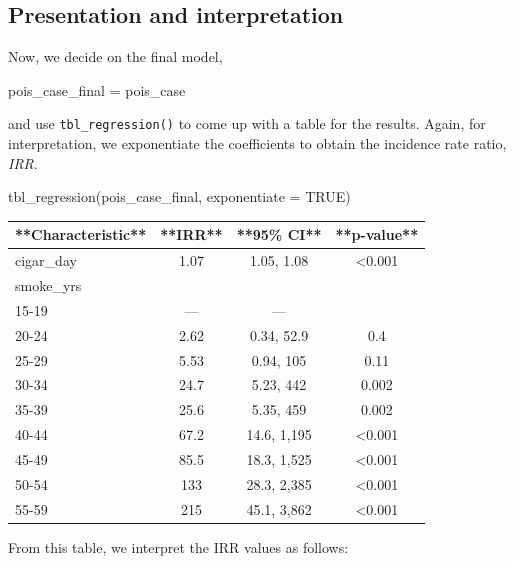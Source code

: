 \documentclass[
  10pt,
]{krantz}
\newenvironment{Shaded}{\begin{snugshade}}{\end{snugshade}}
\newcommand{\AttributeTok}[1]{\textcolor[rgb]{0.77,0.63,0.00}{#1}}
\newcommand{\ConstantTok}[1]{\textcolor[rgb]{0.00,0.00,0.00}{#1}}
\newcommand{\FunctionTok}[1]{\textcolor[rgb]{0.00,0.00,0.00}{#1}}
\newcommand{\NormalTok}[1]{#1}
\newcommand{\OtherTok}[1]{\textcolor[rgb]{0.56,0.35,0.01}{#1}}
\begin{document}
\hypertarget{presentation-and-interpretation-3}{%
\subsection{Presentation and interpretation}\label{presentation-and-interpretation-3}}

Now, we decide on the final model,

\begin{Shaded}
\begin{Highlighting}[]
\NormalTok{pois\_case\_final }\OtherTok{=}\NormalTok{ pois\_case}
\end{Highlighting}
\end{Shaded}

and use \texttt{tbl\_regression()} to come up with a table for the results. Again, for interpretation, we exponentiate the coefficients to obtain the incidence rate ratio, \emph{IRR}.

\begin{Shaded}
\begin{Highlighting}[]
\FunctionTok{tbl\_regression}\NormalTok{(pois\_case\_final, }\AttributeTok{exponentiate =} \ConstantTok{TRUE}\NormalTok{)}
\end{Highlighting}
\end{Shaded}

\begin{tabular}{l|c|c|c}
\hline
**Characteristic** & **IRR** & **95\% CI** & **p-value**\\
\hline
cigar\_day & 1.07 & 1.05, 1.08 & <0.001\\
\hline
smoke\_yrs &  &  & \\
\hline
15-19 & — & — & \\
\hline
20-24 & 2.62 & 0.34, 52.9 & 0.4\\
\hline
25-29 & 5.53 & 0.94, 105 & 0.11\\
\hline
30-34 & 24.7 & 5.23, 442 & 0.002\\
\hline
35-39 & 25.6 & 5.35, 459 & 0.002\\
\hline
40-44 & 67.2 & 14.6, 1,195 & <0.001\\
\hline
45-49 & 85.5 & 18.3, 1,525 & <0.001\\
\hline
50-54 & 133 & 28.3, 2,385 & <0.001\\
\hline
55-59 & 215 & 45.1, 3,862 & <0.001\\
\hline
\end{tabular}

From this table, we interpret the IRR values as follows:
\end{document}
